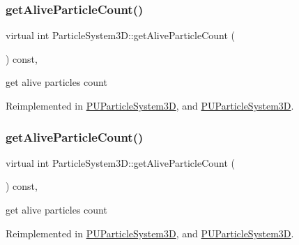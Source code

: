 \subsubsection{\texorpdfstring{get\+Alive\+Particle\+Count()}{getAliveParticleCount()}\hspace{0.1cm}{\footnotesize\ttfamily [1/2]}}
{\footnotesize\ttfamily virtual int Particle\+System3\+D\+::get\+Alive\+Particle\+Count (\begin{DoxyParamCaption}{ }\end{DoxyParamCaption}) const\hspace{0.3cm}{\ttfamily [inline]}, {\ttfamily [virtual]}}

get alive particles count 

Reimplemented in \hyperlink{classPUParticleSystem3D_ae9437aa775ab70f4dde8acedc1ee124d}{P\+U\+Particle\+System3D}, and \hyperlink{classPUParticleSystem3D_a23b835c5c50aba7764c928b9edcb899c}{P\+U\+Particle\+System3D}.

\mbox{\label{classParticleSystem3D_aa7437bbc0845857deea675f0fb137314}} 
\subsubsection{\texorpdfstring{get\+Alive\+Particle\+Count()}{getAliveParticleCount()}\hspace{0.1cm}{\footnotesize\ttfamily [2/2]}}
{\footnotesize\ttfamily virtual int Particle\+System3\+D\+::get\+Alive\+Particle\+Count (\begin{DoxyParamCaption}{ }\end{DoxyParamCaption}) const\hspace{0.3cm}{\ttfamily [inline]}, {\ttfamily [virtual]}}

get alive particles count 

Reimplemented in \hyperlink{classPUParticleSystem3D_ae9437aa775ab70f4dde8acedc1ee124d}{P\+U\+Particle\+System3D}, and \hyperlink{classPUParticleSystem3D_a23b835c5c50aba7764c928b9edcb899c}{P\+U\+Particle\+System3D}.

\mbox{\label{classParticleSystem3D_a20b5bdbd3a43ea851174fa6b680054ed}} 
